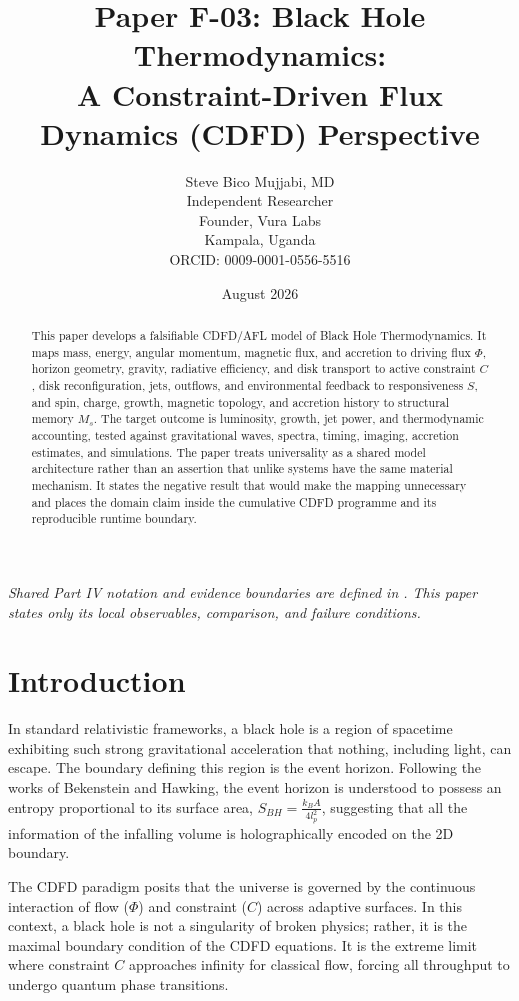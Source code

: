 \documentclass[11pt,a4paper]{article}
\title{\textbf{Paper F-03: Black Hole Thermodynamics:\\ A Constraint-Driven Flux Dynamics (CDFD) Perspective}}
\author{Steve Bico Mujjabi, MD\\
\small Independent Researcher\\
\small Founder, Vura Labs\\
\small Kampala, Uganda\\
\small ORCID: 0009-0001-0556-5516}
\date{August 2026}
\begin{document}
\maketitle

\noindent\textit{Shared Part IV notation and evidence boundaries are defined in . This paper states only its local observables, comparison, and failure conditions.}


\begin{abstract}
This paper develops a falsifiable CDFD/AFL model of Black Hole Thermodynamics. It maps mass, energy, angular momentum, magnetic flux, and accretion to driving flux $\Phi$, horizon geometry, gravity, radiative efficiency, and disk transport to active constraint $C$, disk reconfiguration, jets, outflows, and environmental feedback to responsiveness $S$, and spin, charge, growth, magnetic topology, and accretion history to structural memory $M_s$. The target outcome is luminosity, growth, jet power, and thermodynamic accounting, tested against gravitational waves, spectra, timing, imaging, accretion estimates, and simulations. The paper treats universality as a shared model architecture rather than an assertion that unlike systems have the same material mechanism. It states the negative result that would make the mapping unnecessary and places the domain claim inside the cumulative CDFD programme and its reproducible runtime boundary.
\end{abstract}

\section{Introduction}

In standard relativistic frameworks, a black hole is a region of spacetime exhibiting such strong gravitational acceleration that nothing, including light, can escape. The boundary defining this region is the event horizon. Following the works of Bekenstein and Hawking, the event horizon is understood to possess an entropy proportional to its surface area, $S_{BH} = \frac{k_B A}{4 l_p^2}$, suggesting that all the information of the infalling volume is holographically encoded on the 2D boundary.

The CDFD paradigm posits that the universe is governed by the continuous interaction of flow ($\Phi$) and constraint ($C$) across adaptive surfaces. In this context, a black hole is not a singularity of broken physics; rather, it is the maximal boundary condition of the CDFD equations. It is the extreme limit where constraint $C$ approaches infinity for classical flow, forcing all throughput to undergo quantum phase transitions.
\end{document}
